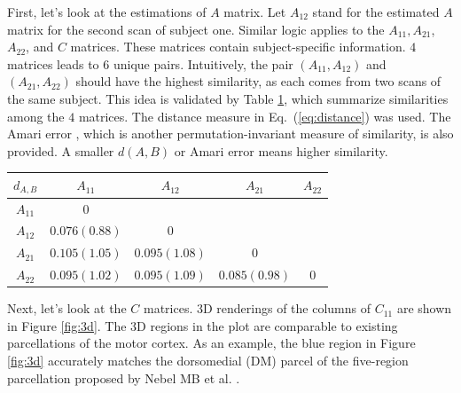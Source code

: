 \documentclass[times,twocolumn,final,authoryear]{elsarticle}
\let\oldref\ref
\renewcommand{\ref}[1]{(\oldref{#1})}
\begin{document}
First, let's look at the estimations of $A$ matrix. Let $A_{12}$ stand for the estimated $A$ matrix for the second scan of subject one. Similar logic applies to the $A_{11}, A_{21}$, $A_{22}$, and $C$ matrices. These matrices contain subject-specific information. $4$ matrices leads to $6$ unique pairs. Intuitively, the pair $(A_{11},A_{12})$ and $(A_{21},A_{22})$ should have the highest similarity, as each comes from two scans of the same subject. This idea is validated by Table \oldref{tab:similarity}, which summarize similarities among the  $4$ matrices. The distance measure in Eq.~\ref{eq:distance} was used. The Amari error \citep{amari1996new}, which is another permutation-invariant measure of similarity, is also provided. A smaller $d(A,B)$ or Amari error means higher similarity.
\begin{table}
\centering
{}
\label{tab:similarity}
\begin{tabular}{c|cccc}
\hline
$d_{A,B}$ & $A_{11}$&$A_{12}$ & $A_{21}$&$A_{22}$ \\
\hline
$A_{11}$ & $0$ &  &  &\\
$A_{12}$ & $\mathbf{0.076(0.88)}$& $0$ & &\\
$A_{21}$ & $0.105(1.05)$ & $0.095(1.08)$  & $0$ &\\
$A_{22}$ & $0.095(1.02)$ & $0.095(1.09)$ & $\mathbf{0.085(0.98)}$ & $0$ \\
\hline
\end{tabular}
\end{table}

Next, let's look at the $C$ matrices. 3D renderings of the columns of $C_{11}$ are shown in Figure \oldref{fig:3d}. The 3D regions in the plot are comparable to existing parcellations of the motor cortex. As an example, the blue region in Figure \oldref{fig:3d} accurately matches the dorsomedial (DM) parcel of the five-region parcellation proposed by Nebel MB et al. \citep{nebel2014disruption}.
\end{document}
